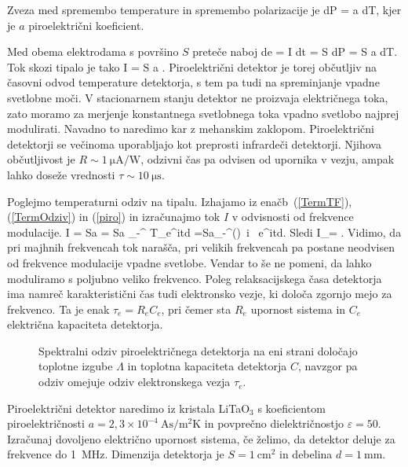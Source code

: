 Zveza med spremembo temperature in spremembo polarizacije je
\beq
dP = a dT,
\eeq
kjer je $a$ piroelektrični koeficient. 

Med obema elektrodama s površino $S$ preteče naboj
\beq
de = I dt = S dP = S a dT.
\eeq
Tok skozi tipalo je tako
\beq
I = S a .
\label{piro}
\eeq
Piroelektrični detektor je torej občutljiv na časovni odvod temperature detektorja, 
s tem pa tudi na spreminjanje vpadne svetlobne moči. V stacionarnem stanju 
detektor ne proizvaja električnega toka, zato moramo za merjenje 
konstantnega svetlobnega toka vpadno svetlobo najprej modulirati.
Navadno to naredimo kar z mehanskim zaklopom. Piroelektrični detektorji
se večinoma uporabljajo kot preprosti infrardeči detektorji. 
Njihova občutljivost je $R \sim 1~\si{\micro\ampere/\watt}$, odzivni čas pa odvisen od 
upornika v vezju, ampak lahko doseže vrednosti $\tau \sim 10~\si{\micro\second}$.

Poglejmo temperaturni odziv na tipalu. Izhajamo iz enačb~(\ref{TermTF}), (\ref{TermOdziv}) in
(\ref{piro}) in izračunajmo tok $I$ v odvisnosti od frekvence modulacije.
\beq
I = Sa  = Sa  \int_{-\infty}^{\infty} T_\omega e^{i\omega t}d\omega 
=Sa\int_{-\infty}^{\infty}\left(\right) \,i \omega\,
e^{i\omega t}d\omega.
\eeq
Sledi 
\beq
I_\omega = .
\eeq
Vidimo, da pri majhnih frekvencah tok narašča, pri velikih frekvencah pa postane neodvisen od
frekvence modulacije vpadne svetlobe. Vendar to še ne pomeni, da lahko moduliramo s poljubno 
veliko frekvenco. Poleg relaksacijskega časa detektorja ima namreč karakteristični čas tudi
elektronsko vezje, ki določa zgornjo mejo za frekvenco. Ta je enak $\tau_e = R_eC_e$, pri čemer
sta $R_e$ upornost sistema in $C_e$ električna kapaciteta detektorja. 
\begin{figure}[h]
\centering
\def\svgwidth{65truemm} 

\caption{Spektralni odziv piroelektričnega detektorja na eni strani določajo toplotne izgube 
$\Lambda$ in toplotna kapaciteta detektorja $C$, navzgor pa odziv omejuje odziv elektronskega vezja $\tau_e$.}
\label{fig:Piro}
\end{figure}

\begin{definition}
Piroelektrični detektor naredimo iz kristala LiTaO$_3$ s koeficientom piroelektričnosti
$a = 2,3 \times 10^{-4}~\si{\ampere \second /\metre^2 \kelvin}$ in povprečno 
dielektričnostjo $\varepsilon = 50$. Izračunaj dovoljeno električno upornost sistema, 
če želimo, da detektor deluje za frekvence do 1~MHz. 
Dimenzija detektorja je $S = 1~\si{\centi\metre^2}$ in debelina $d = 1~\si{\milli\metre}$.
\end{definition}

